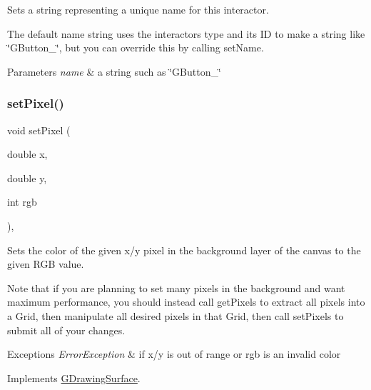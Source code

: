 Sets a string representing a unique name for this interactor. 

The default name string uses the interactor\textquotesingle{}s type and its ID to make a string like \char`\"{}\+G\+Button\+\_\char`\"{}, but you can override this by calling set\+Name. 
\begin{DoxyParams}{Parameters}
{\em name} & a string such as \char`\"{}\+G\+Button\+\_\char`\"{} \\
\hline
\end{DoxyParams}
\mbox{\label{classGCanvas_a05b3441e912e4c0ed45e9ed43bb745d1}} 
\subsubsection{\texorpdfstring{set\+Pixel()}{setPixel()}\hspace{0.1cm}{\footnotesize\ttfamily [1/3]}}
{\footnotesize\ttfamily void set\+Pixel (\begin{DoxyParamCaption}\item[{double}]{x,  }\item[{double}]{y,  }\item[{int}]{rgb }\end{DoxyParamCaption})\hspace{0.3cm}{\ttfamily [override]}, {\ttfamily [virtual]}}



Sets the color of the given x/y pixel in the background layer of the canvas to the given R\+GB value. 

Note that if you are planning to set many pixels in the background and want maximum performance, you should instead call get\+Pixels to extract all pixels into a Grid, then manipulate all desired pixels in that Grid, then call set\+Pixels to submit all of your changes.


\begin{DoxyExceptions}{Exceptions}
{\em Error\+Exception} & if x/y is out of range or rgb is an invalid color \\
\hline
\end{DoxyExceptions}


Implements \mbox{\hyperlink{classGDrawingSurface_ac9f0a75ccb0abe1123046bab56479b84}{G\+Drawing\+Surface}}.

\mbox{\label{classGCanvas_a92c3e3ef930ae7742ad384af28aac241}} 
